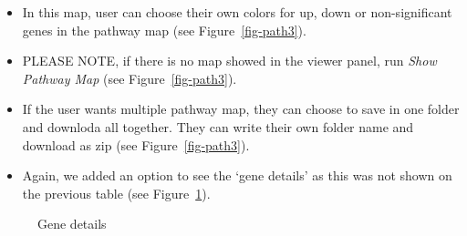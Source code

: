 \documentclass[
  a4paper,
  DIV=11,
  numbers=noendperiod,
  oneside,
  open=any]{scrreport}
\begin{document}
\begin{itemize}
\item
  In this map, user can choose their own colors for up, down or
  non-significant genes in the pathway map (see Figure~\ref{fig-path3}).
\item
  PLEASE NOTE, if there is no map showed in the viewer panel, run
  \emph{Show Pathway Map} (see Figure~\ref{fig-path3}).
\item
  If the user wants multiple pathway map, they can choose to save in one
  folder and downloda all together. They can write their own folder name
  and download as zip (see Figure~\ref{fig-path3}).
\item
  Again, we added an option to see the `gene details' as this was not
  shown on the previous table (see Figure~\ref{fig-path4}).
\end{itemize}

\begin{figure}[H]


\caption{\label{fig-path4}Gene details}

\end{figure}%
\end{document}
